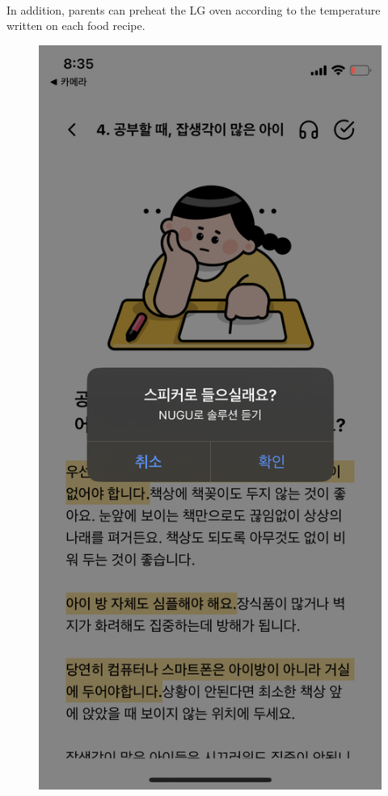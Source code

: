 \documentclass[conference]{IEEEtran}
\begin{document}
\begin{enumerate}
\begin{enumerate}
        \\In addition, parents can preheat the LG oven according to the temperature written on each food recipe.
        \vspace{0.5cm}
        \begin{figure}[H]
        \centering
        \includegraphics[scale=0.1]{UseCases/9.solution_speaker.png}

\end{figure}
\end{enumerate}
\end{enumerate}
\end{document}
